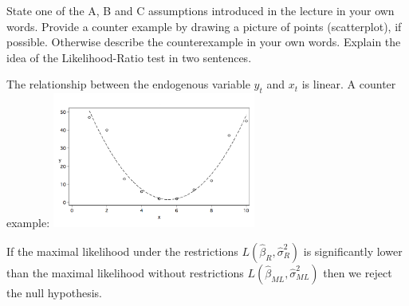 \documentclass{article}
\begin{document}
\setcounter{page}{1}
\begin{Exercise}[title=(Understanding)]
	\Question State one of the A, B and C assumptions introduced in the lecture in your own words. Provide a counter example by drawing a picture of points (scatterplot), if possible. Otherwise describe the counterexample in your own words.
	\Question Explain the idea of the Likelihood-Ratio test in two	sentences.	
\end{Exercise}
\begin{Answer}
	\Question
	The relationship between the endogenous variable $y_t$ and $x_t$ is linear. A counter example:
	\includegraphics[width=0.5\textwidth]{plots/quadratic.png}
	
	\Question
	If the maximal likelihood under the restrictions $L(\hat{\beta}_R,\hat{\sigma}^2_R)$ is significantly lower than the maximal likelihood without restrictions $L(\hat{\beta}_{ML},\hat{\sigma}^2_{ML})$ then we reject the null hypothesis.
\end{Answer}
\newpage
\end{document}
